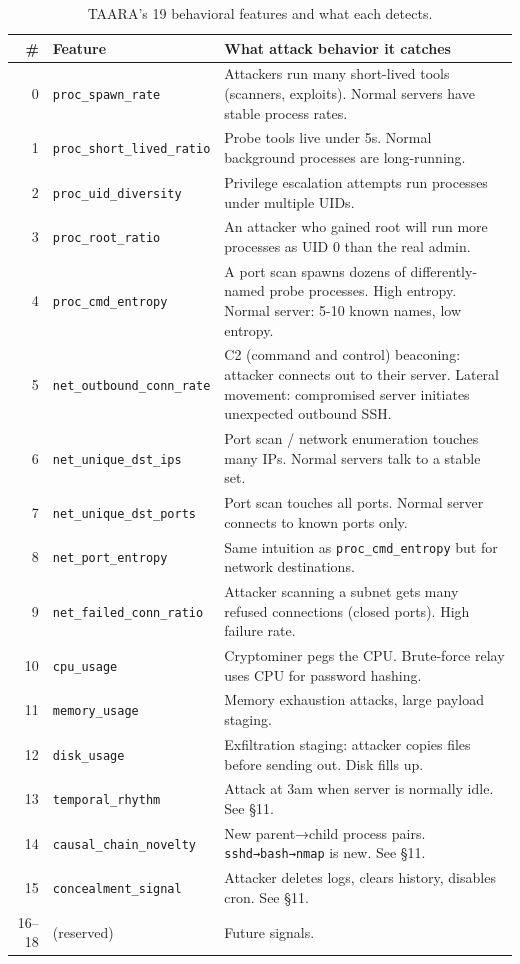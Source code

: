\documentclass[11pt,a4paper]{article}
\begin{document}
\begin{table}[H]
\centering\small
\begin{tabular}{@{}rp{3.5cm}p{7cm}@{}}
\toprule
\# & Feature & What attack behavior it catches \\
\midrule
0 & \texttt{proc\_spawn\_rate} & Attackers run many short-lived tools (scanners, exploits). Normal servers have stable process rates. \\
1 & \texttt{proc\_short\_lived\_ratio} & Probe tools live under 5s. Normal background processes are long-running. \\
2 & \texttt{proc\_uid\_diversity} & Privilege escalation attempts run processes under multiple UIDs. \\
3 & \texttt{proc\_root\_ratio} & An attacker who gained root will run more processes as UID 0 than the real admin. \\
4 & \texttt{proc\_cmd\_entropy} & A port scan spawns dozens of differently-named probe processes. High entropy. Normal server: 5-10 known names, low entropy. \\
5 & \texttt{net\_outbound\_conn\_rate} & C2 (command and control) beaconing: attacker connects out to their server. Lateral movement: compromised server initiates unexpected outbound SSH. \\
6 & \texttt{net\_unique\_dst\_ips} & Port scan / network enumeration touches many IPs. Normal servers talk to a stable set. \\
7 & \texttt{net\_unique\_dst\_ports} & Port scan touches all ports. Normal server connects to known ports only. \\
8 & \texttt{net\_port\_entropy} & Same intuition as \texttt{proc\_cmd\_entropy} but for network destinations. \\
9 & \texttt{net\_failed\_conn\_ratio} & Attacker scanning a subnet gets many refused connections (closed ports). High failure rate. \\
10 & \texttt{cpu\_usage} & Cryptominer pegs the CPU. Brute-force relay uses CPU for password hashing. \\
11 & \texttt{memory\_usage} & Memory exhaustion attacks, large payload staging. \\
12 & \texttt{disk\_usage} & Exfiltration staging: attacker copies files before sending out. Disk fills up. \\
13 & \texttt{temporal\_rhythm} & Attack at 3am when server is normally idle. See \S11. \\
14 & \texttt{causal\_chain\_novelty} & New parent→child process pairs. \texttt{sshd→bash→nmap} is new. See \S11. \\
15 & \texttt{concealment\_signal} & Attacker deletes logs, clears history, disables cron. See \S11. \\
16--18 & (reserved) & Future signals. \\
\bottomrule
\end{tabular}
\caption{TAARA's 19 behavioral features and what each detects.}
\end{table}
\end{document}
